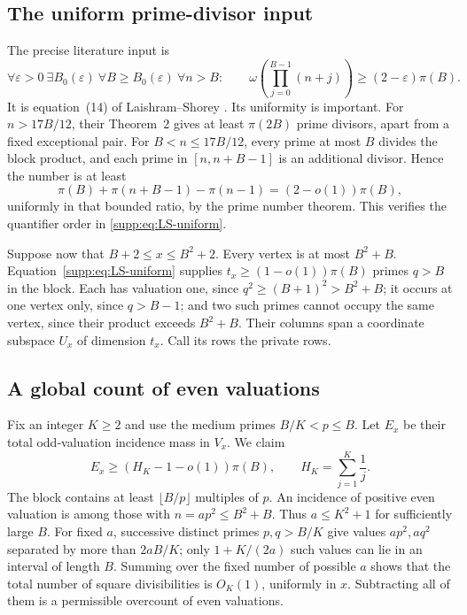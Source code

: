 \subsection{The uniform prime-divisor input}
The precise literature input is
\begin{equation}\label{supp:eq:LS-uniform}
 \forall\varepsilon>0\ \exists B_0(\varepsilon)\ \forall B\ge B_0(\varepsilon)
 \ \forall n>B:\qquad
 \omega\left(\prod_{j=0}^{B-1}(n+j)\right)\ge(2-\varepsilon)\pi(B).
\end{equation}
It is equation~(14) of Laishram--Shorey \cite{LaishramShorey2004}.
Its uniformity is important. For $n>17B/12$, their Theorem~2 gives
at least $\pi(2B)$ prime divisors, apart from a fixed exceptional pair.
For $B<n\le17B/12$, every prime at most $B$ divides the block product,
and each prime in $[n,n+B-1]$ is an additional divisor. Hence the number
is at least
\[
 \pi(B)+\pi(n+B-1)-\pi(n-1)=(2-o(1))\pi(B),
\]
uniformly in that bounded ratio, by the prime number theorem.
This verifies the quantifier order in \eqref{supp:eq:LS-uniform}.

Suppose now that $B+2\le x\le B^2+2$. Every vertex is at most
$B^2+B$. Equation~\eqref{supp:eq:LS-uniform} supplies
$t_x\ge(1-o(1))\pi(B)$ primes $q>B$ in the block.
Each has valuation one, since $q^2\ge(B+1)^2>B^2+B$; it occurs at
one vertex only, since $q>B-1$; and two such primes cannot occupy the
same vertex, since their product exceeds $B^2+B$.
Their columns span a coordinate subspace $U_x$ of dimension $t_x$.
Call its rows the private rows.

\subsection{A global count of even valuations}
Fix an integer $K\ge2$ and use the medium primes $B/K<p\le B$.
Let $E_x$ be their total odd-valuation incidence mass in $V_x$.
We claim
\begin{equation}\label{supp:eq:medium-mass}
 E_x\ge(H_K-1-o(1))\pi(B),\qquad H_K=\sum_{j=1}^K\frac1j.
\end{equation}
The block contains at least $\lfloor B/p\rfloor$ multiples of $p$.
An incidence of positive even valuation is among those with
$n=ap^2\le B^2+B$. Thus $a\le K^2+1$ for sufficiently large $B$.
For fixed $a$, successive distinct primes $p,q>B/K$ give values
$ap^2,aq^2$ separated by more than $2aB/K$; only
$1+K/(2a)$ such values can lie in an interval of length $B$.
Summing over the fixed number of possible $a$ shows that the total
number of square divisibilities is $O_K(1)$, uniformly in $x$.
Subtracting all of them is a permissible overcount of even valuations.

